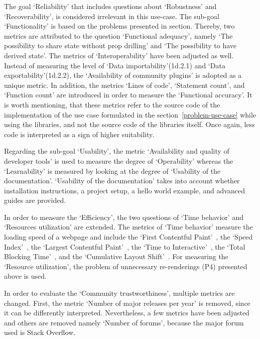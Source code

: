 The goal `Reliability' that includes questions about `Robustness' and
`Recoverability', is considered irrelevant in this use-case. The
sub-goal `Functionality' is based on the problems presented in section. Thereby, two metrics are attributed to the question `Functional
adequacy', namely `The possibility to share state without prop drilling'
and `The possibility to have derived state'. The metrics of
`Interoperability' have been adjusted as well. Instead of measuring the
level of `Data importability'(1d.2.1) and `Data exportability'(1d.2.2), the
`Availability of community plugins' is adopted as a unique metric. In
addition, the metrics `Lines of code', `Statement count', and `Function
count' are introduced in order to measure the `Functional accuracy'. It
is worth mentioning, that these metrics refer to the source code of the
implementation of the use case formulated in the section~\ref{problem-use-case} while using the
libraries, and not the source code of the libraries itself. Once again,
less code is interpreted as a sign of higher suitability.

Regarding the sub-goal `Usability', the metric `Availability and quality
of developer tools' is used to measure the degree of `Operability'
whereas the `Learnability' is measured by looking at the degree of
`Usability of the documentation'. `Usability of the documentation' takes
into account whether installation instructions, a project setup, a hello
world example, and advanced guides are provided.

In order to measure the `Efficiency', the two questions of `Time
behavior' and `Resources utilization' are extended. The metrics of `Time
behavior' measure the loading speed of a webpage and include
the `First Contentful Paint'~\cite{first_contentful_paint},
the `Speed Index'~\cite{speed_index},
the `Largest Contentful Paint'~\cite{largest_contentful_paint},
the `Time to Interactive'~\cite{time_to_interactive},
the `Total Blocking Time'~\cite{total_blocking_time}, and the
`Cumulative Layout Shift'~\cite{cumulative_layout_shift}.
For measuring the
`Resource utilization', the problem of unnecessary re-renderings (P4)
presented above is used.

In order to evaluate the `Community
trustworthiness', multiple metrics are changed. First, the metric
`Number of major releases per year' is removed, since it can be
differently interpreted. Nevertheless, a few metrics have been adjusted
and others are removed namely `Number of forums', because the major
forum used is Stack Overflow.

